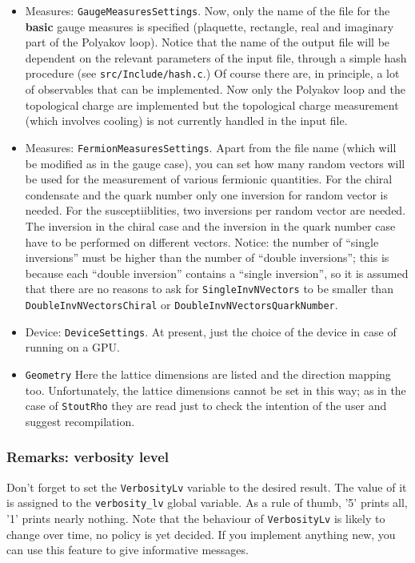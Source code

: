\begin{itemize}
    \item{Measures: \verb|GaugeMeasuresSettings|.} Now, only the name of the 
        file for the {\bf basic} gauge measures is specified (plaquette, 
rectangle, real and imaginary part of the Polyakov loop). 
        Notice that the name of the 
output file will be dependent on the relevant parameters of the input file, 
through a simple hash procedure (see \verb|src/Include/hash.c|.)
        Of course there are, in principle, a lot of observables that 
can be implemented. Now only the Polyakov loop and the topological charge are 
implemented but the topological charge measurement (which involves cooling) is 
not currently handled in the input file. 
    \item{Measures: \verb|FermionMeasuresSettings|.}
    Apart from the file name (which will be modified as in the gauge case),   
you can set how many random vectors will be used for the measurement of various 
fermionic quantities. For the chiral condensate and the quark number only one 
inversion for random vector is needed. For the susceptiiblities, two inversions 
per random vector are needed. The inversion in the chiral case and the inversion 
in the quark number case have to be performed on different vectors. Notice: the 
number of ``single inversions'' must be higher than the 
number of ``double inversions''; this is because each ``double inversion'' 
contains a ``single inversion'', so it is assumed that there are no reasons to 
ask for \verb|SingleInvNVectors| to be smaller than 
\verb|DoubleInvNVectorsChiral| or \verb|DoubleInvNVectorsQuarkNumber|.
    
    
    \item{Device: \verb|DeviceSettings|.} At present, just the choice of the 
        device in case of running on a GPU.
    \item{\verb|Geometry|} Here the lattice dimensions are listed and the 
        direction mapping too. Unfortunately, the lattice dimensions cannot be set in 
        this way; as in the case of \verb|StoutRho| they are read just to check the 
        intention of the user and suggest recompilation.  
\end{itemize}


\subsubsection{Remarks: verbosity level}
Don't forget to set the \verb|VerbosityLv| variable to the desired result. 
The value of it is assigned to the \verb|verbosity_lv| global variable.
As a rule of thumb, '5' prints all, '1' prints nearly nothing. Note
that the behaviour of \verb|VerbosityLv| is likely to change over time, no
policy is yet decided. If you implement anything new, you can use this 
feature to give informative messages.

